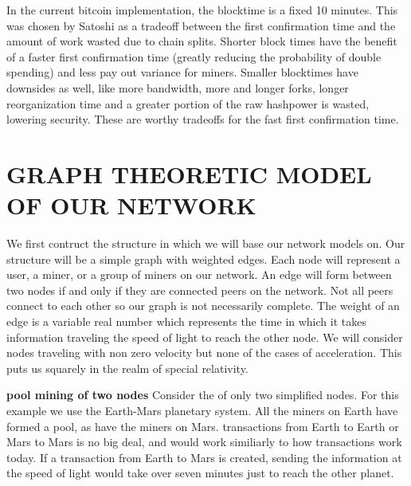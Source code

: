 \documentclass[conference]{IEEEtran}
\begin{document}
In the current bitcoin implementation, the blocktime is a fixed 10 minutes. This was chosen by Satoshi as a tradeoff between the first confirmation time and the amount of work wasted due to chain splits. Shorter block times have the benefit of a faster first confirmation time (greatly reducing the probability of double spending) and less pay out variance for miners. Smaller blocktimes have downsides as well, like more bandwidth, more and longer forks, longer reorganization time and a greater portion of the raw hashpower is wasted, lowering security. These are worthy tradeoffs for the fast first confirmation time. 

\section{GRAPH THEORETIC MODEL OF OUR NETWORK}
We first contruct the structure in which we will base our network models on. Our structure will be a simple graph with weighted edges. Each node will represent a user, a miner, or a group of miners on our network. An edge will form between two nodes if and only if they are connected peers on the network. Not all peers connect to each other so our graph is not necessarily complete. The weight of an edge is a variable real number which represents the time in which it takes information traveling the speed of light to reach the other node. We will consider nodes traveling with non zero velocity but none of the cases of acceleration. This puts us squarely in the realm of special relativity. 
 
\textbf{pool mining of two nodes} Consider the of only two simplified nodes. For this example we use the Earth-Mars planetary system. All the miners on Earth have formed a pool, as have the miners on Mars. transactions from Earth to Earth or Mars to Mars is no big deal, and would work similiarly to how transactions work today. If a transaction from Earth to Mars is created, sending the information at the speed of light would take over seven minutes just to reach the other planet. 
\end{document}
